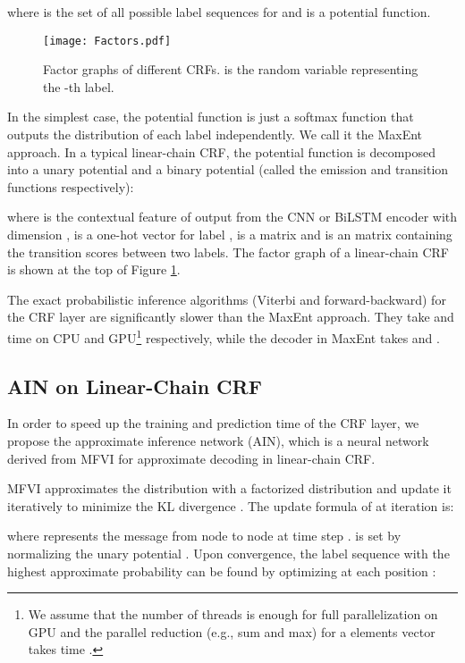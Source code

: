 \documentclass[11pt,a4paper]{article}
\begin{document}
where  is the set of all possible label sequences for  and  is a potential function. 





\begin{figure}[t]
\centering
\texttt{[image: Factors.pdf]}
\caption{Factor graphs of different CRFs.  is the random variable representing the -th label.}
\label{fig:crf_structure}
\end{figure}


In the simplest case, the potential function is just a softmax function that outputs the distribution of each label independently. We call it the MaxEnt approach. In a typical linear-chain CRF, the potential function is decomposed into a unary potential  and a binary potential  (called the emission and transition functions respectively):

where  is the contextual feature of  output from the CNN or BiLSTM encoder with dimension ,  is a one-hot vector for label ,  is a  matrix and  is an  matrix containing the transition scores between two labels. The factor graph of a linear-chain CRF is shown at the top of Figure \ref{fig:crf_structure}.

The exact probabilistic inference algorithms (Viterbi and forward-backward)
for the CRF layer are significantly slower than the MaxEnt approach. They take  and  time on CPU and GPU\footnote{We assume that the number of threads is enough for full parallelization on GPU and the parallel reduction (e.g., sum and max) for a  elements vector takes  time \cite{harris2007optimizing}.} respectively, while the decoder in MaxEnt takes  and . 



\subsection{AIN on Linear-Chain CRF}
\label{sec:first-order}
In order to speed up the training and prediction time of the CRF layer, we propose the approximate inference network (AIN), which is a neural network derived from MFVI for approximate decoding in linear-chain CRF.

MFVI approximates the distribution  with a factorized distribution  and update it iteratively to minimize the KL divergence . The update formula of  at iteration  is:

where  represents the message from node  to node  at time step .  is set by normalizing the unary potential . Upon convergence, the label sequence with the highest approximate probability  can be found by optimizing  at each position :
\end{document}
